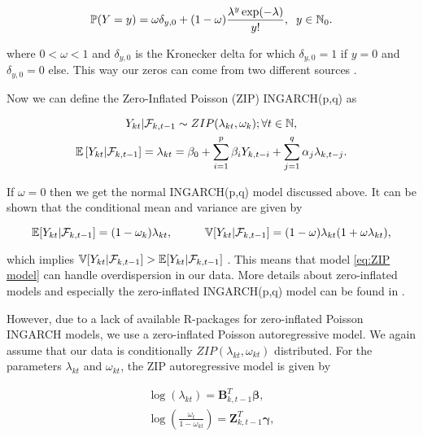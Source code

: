 \begin{equation}
\mathbb{P}(Y=y) = \omega \delta_{y,0}+ (1-\omega) \frac{\lambda^y \exp(-\lambda)}{y!}, \hspace{0.2cm} y \in \mathbb{N}_0.
\label{eq:ZIP Distribution}
\end{equation}

where $0 < \omega < 1$ and $\delta_{y,0}$ is the Kronecker delta for which $\delta_{y,0}=1$ if $y=0$ and $\delta_{y,0}=0$ else. This way our zeros can come from two different sources \cite{Zhu:2012}. 

Now we can define the Zero-Inflated Poisson (ZIP) INGARCH(p,q) as

\begin{gather}
\label{eq:ZIP model}
Y_{kt} | \mathcal{F}_{k,t-1} \sim ZIP(\lambda_{kt},\omega_k); \forall t \in \mathbb{N}, \\
\mathbb{E}\left[Y_{kt} | \mathcal{F}_{k,t-1} \right] = \lambda_{kt} = \beta_0 + \sum_{i=1}^p\beta_i Y_{k,t-i} + \sum_{j=1}^q\alpha_j \lambda_{k,t-j}.
\end{gather}

If $\omega =0$ then we get the normal INGARCH(p,q) model discussed above. It can be shown that the conditional mean and variance are given by

\begin{equation}
\mathbb{E}[Y_{kt} | \mathcal{F}_{k,t-1}] = (1-\omega_k)\lambda_{kt}, \hspace{1cm} \mathbb{V}[Y_{kt} | \mathcal{F}_{k,t-1}] =(1-\omega)\lambda_{kt}(1+\omega \lambda_{kt}),
\label{eq:Conditional Mean and Variance ZIP}
\end{equation}

which implies $ \mathbb{V}[Y_{kt} | \mathcal{F}_{k,t-1}] > \mathbb{E}[Y_{kt} | \mathcal{F}_{k,t-1}]$ \cite{Zhu:2012}. This means that model \ref{eq:ZIP model} can handle overdispersion in our data. More details about zero-inflated models and especially the zero-inflated INGARCH(p,q) model can be found in \cite{Zhu:2012}.

However, due to a lack of available R-packages for zero-inflated Poisson INGARCH models, we use a zero-inflated Poisson autoregressive model. We again assume that our data is conditionally $ZIP(\lambda_{kt},\omega_{kt})$ distributed. For the parameters $\lambda_{kt}$ and $\omega_{kt}$, the ZIP autoregressive model is given by \cite{Yang:2013}

\begin{gather}
\log(\lambda_{kt}) = \bm{B}^T_{k,t-1} \bm{\beta},\\
\log\left(\frac{\omega_{t}}{1-\omega_{kt}}\right)=\bm{Z}_{k,t-1}^T\bm{\gamma},
\label{eq:ZIP Autoregressive model}
\end{gather}

